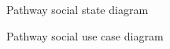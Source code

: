 \documentclass{article}
\begin{document}
\begin{figure}[H]
    \centering
    \begin{center}
    \end{center}
    \caption{Pathway social state diagram}
    \label{fig:my_label}
\end{figure}

\begin{figure}[H]
    \centering
    \begin{center}
    \end{center}
    \caption{Pathway social use case diagram}
    \label{fig:my_label}
\end{figure}
\end{document}
